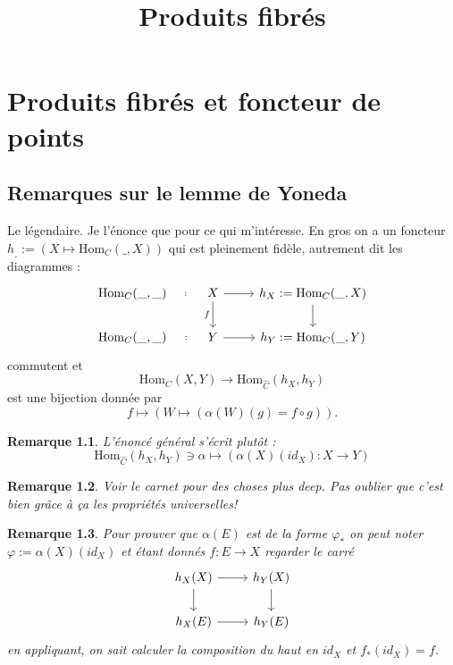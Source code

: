 \documentclass[a4paper,12pt]{book}
\title{Produits fibrés}
\date{}
\newcommand{\Hom}{\textrm{Hom}}
\theoremstyle{plain}
\newtheorem{rem}{Remarque}
\theoremstyle{definition}
\theoremstyle{remark}
\begin{document}
\maketitle
\tableofcontents


\chapter{Produits fibrés et foncteur de points}
\section{Remarques sur le lemme de Yoneda}
Le légendaire. Je l'énonce que pour ce qui m'intéresse.
En gros on a un foncteur $h_{\_}:=(X\mapsto \Hom_C(\_,X))$
qui est pleinement fidèle, autrement dit les diagrammes :
\[\begin{tikzcd}
	{\Hom_{C}(\_,\_)} & X & {h_X:=\Hom_C(\_,X)} \\
	{\Hom_{C}(\_,\_)} & Y & {h_Y:=\Hom_C(\_,Y)}
	\arrow["\colon"{description}, draw=none, from=1-1, to=1-2]
	\arrow[from=1-2, to=1-3]
	\arrow["f"', from=1-2, to=2-2]
	\arrow[from=1-3, to=2-3]
	\arrow["\colon"{description}, draw=none, from=2-1, to=2-2]
	\arrow[from=2-2, to=2-3]
\end{tikzcd}\]
commutent et 
\[\Hom_C(X,Y)\to \Hom_{\widehat C}(h_X,h_Y)\]
est une bijection donnée par 
\[f\mapsto (W\mapsto (\alpha(W)(g)=f\circ g)).\]
\begin{rem}
  L'énoncé général s'écrit plutôt :
  \[\Hom_{\widehat C}(h_X,h_Y)\ni \alpha\mapsto (\alpha(X)(id_X)\colon X\to Y)\]
\end{rem}
\begin{rem}
  Voir le carnet pour des choses plus deep. Pas oublier
  que c'est bien grâce à ça les propriétés universelles!
\end{rem}
\begin{rem}
  Pour prouver que $\alpha(E)$ est de la forme $\varphi_*$ on peut
  noter $\varphi:=\alpha(X)(id_X)$ et étant donnés $f\colon E\to X$
  regarder le carré
\[\begin{tikzcd}
	{h_X(X)} & {h_Y(X)} \\
	{h_X(E)} & {h_Y(E)}
	\arrow[from=1-1, to=1-2]
	\arrow[from=1-1, to=2-1]
	\arrow[from=1-2, to=2-2]
	\arrow[from=2-1, to=2-2]
\end{tikzcd}\]
  en appliquant, on sait calculer la composition du haut en $id_X$
  et $f_*(id_X)=f$.
\end{rem}
\end{document}
